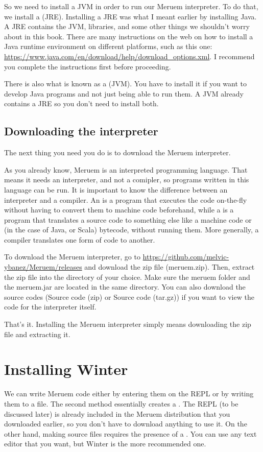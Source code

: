 So we need to install a JVM in order to run our Meruem interpreter. To do that, we install a  (JRE). Installing a JRE was what I meant earlier by installing Java. A JRE contains the JVM, libraries, and some other things we shouldn't worry about in this book. There are many instructions on the web on how to install a Java runtime environment on different platforms, such as this one: \url{ https://www.java.com/en/download/help/download_options.xml}. I recommend you complete the instructions first before proceeding.

\begin{noteparagraph}
There is also what is known as a  (JVM). You have to install it if you want to develop Java programs and not just being able to run them. A JVM already contains a JRE so you don't need to install both.
\end{noteparagraph}

\subsection{Downloading the interpreter}
The next thing you need you do is to download the Meruem interpreter. 

As you already know, Meruem is an interpreted programming language. That means it needs an interpreter, and not a comipler, so programs written in this language can be run. It is important to know the difference between an interpreter and a compiler. An  is a program that executes the code on-the-fly without having to convert them to machine code beforehand, while a  is a program that translates a source code to something else like a machine code or (in the case of Java, or Scala) bytecode, without running them. More generally, a compiler translates one form of code to another.

To download the Meruem interpreter, go to \url{https://github.com/melvic-ybanez/Meruem/releases} and download the zip file (meruem.zip). Then, extract the zip file into the directory of your choice. Make sure the meruem folder and the meruem.jar are located in the same directory. You can also download the source codes (Source code (zip) or Source code (tar.gz)) if you want to view the code for the interpreter itself. 

That's it. Installing the Meruem interpreter simply means downloading the zip file and extracting it. 

\section{Installing Winter}
We can write Meruem code either by entering them on the REPL or by writing them to a file. The second method essentially creates a . The REPL (to be discussed later) is already included in the Meruem distribution that you downloaded earlier, so you don't have to download anything to use it. On the other hand, making source files requires the presence of a . You can use any text editor that you want, but Winter is the more recommended one. 

